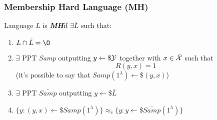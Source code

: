 \subsubsection{Membership Hard Language (MH)}
\begin{definition}
    Language $L$ is \textit{ \textbf{MH}}if $ \exists  \bar{L}$ such that:
    \begin{enumerate}
        \item $L \cap \bar{L} = \O$
        \item $ \exists$ PPT \textit{Samp} outputting $y \leftarrow\$ \mathcal{Y}$
            together with $x \in \bar{\mathcal{X}}$ such that 
            \[
              R(y,x)=1  
            \]
            (it's possible
            to say that $Samp(1^{\lambda}) \leftarrow\$ (y,x)$)
        \item $ \exists$ PPT $\bar{Samp}$ outputting $y \leftarrow\$ \bar{L}$
        \item $\{y:(y,x) \leftarrow\$ Samp(1^{\lambda})\} \approx_{c} \{y:y
            \leftarrow\$ \bar{Samp}(1^{\lambda})\}$
    \end{enumerate}
    
\end{definition}

